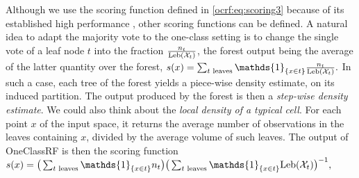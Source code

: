 \begin{remark}
Although we use the scoring function defined in \eqref{ocrf:eq:scoring3} because of its established high performance \citep{Liu2008}, other scoring functions can be defined.
A natural idea to adapt the majority vote to the one-class setting is to change the single vote of a leaf node $t$ into the fraction $\frac{n_t}{\text{Leb}(\mathcal{X}_t)}$, the forest output being the average of the latter quantity over the forest,
$s(x) = \sum_{t \text{~leaves}} \mathds{1}_{\{ x \in t \}} \frac{n_t}{\leb(\mathcal{X}_t)}.$
In such a case, each tree of the forest yields a piece-wise density estimate, on its induced partition. %
The output produced by the forest is then a \emph{step-wise density estimate}.
%
We could also think about the \emph{local density of a typical cell}.
For each point $x$ of the input space, it returns the average number of observations in the leaves containing $x$, divided by the average volume of such leaves.
The output of OneClassRF is then the scoring function
$s(x) = \big(\sum_{t \text{~leaves}} \mathds{1}_{\{ x \in t \}} n_t\big) \big(\sum_{t \text{~leaves}} \mathds{1}_{\{ x \in t \}} \leb(\mathcal{X}_t)\big)^{-1} ,$

\end{remark}

